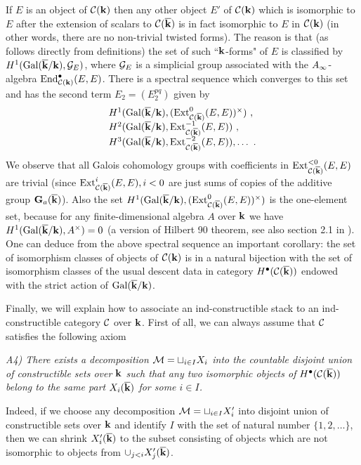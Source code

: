 \documentclass[12pt]{article}
\begin{document}
If $E$ is an object of ${\mathcal C}({\bf k})$ then any other object $E'$ of ${\mathcal C}({\bf k})$ which is isomorphic to $E$ after the extension of scalars to ${\mathcal C}({\overline{\bf k}})$
is in fact isomorphic to $E$ in ${\mathcal C}({\bf k})$ (in other words, there are no non-trivial twisted forms).
The reason is that (as follows directly from definitions) the set of such ``${\bf k}$-forms" of $E$
is classified by $H^1(\operatorname{Gal}(\overline{{\bf k}}/{\bf k}),{\cal G}_E)$, where ${\cal G}_E$ is a simplicial group
associated with the $A_{\infty}$-algebra $\operatorname{End}^\bullet_{{\mathcal C}({\bf k})}(E,E)$.
There is a spectral sequence
which converges to this set and has the second term $E_2=(E_2^{pq})$  given by
$$\begin{array}{l}
H^1(\operatorname{Gal}(\overline{{\bf k}}/{\bf k}),(\operatorname{Ext}_{{\mathcal C}({{\overline{\bf k}}})}^0(E,E))^{\times})\,\,,\\ H^2(\operatorname{Gal}(\overline{{\bf k}}/{\bf k}),\operatorname{Ext}_{{\mathcal C}({{\overline{\bf k}}})}^{-1}(E,E))\,\,,\\
H^3(\operatorname{Gal}(\overline{{\bf k}}/{\bf k}),\operatorname{Ext}_{{\mathcal C}({{\overline{\bf k}}})}^{-2}(E,E)),\dots\,\,.
\end{array}$$
We observe that all Galois cohomology groups with coefficients in $\operatorname{Ext}_{{\mathcal C}({{\overline{\bf k}}})}^{<0}(E,E)$ are trivial
(since  $\operatorname{Ext}_{{\mathcal C}({{\overline{\bf k}}})}^{i}(E,E), i<0$  are just sums of copies of the additive group ${\bf G}_a({\overline{\bf k}})$). Also the set 
$H^1(\operatorname{Gal}(\overline{{\bf k}}/{\bf k}),(\operatorname{Ext}_{{\mathcal C}({{\overline{\bf k}}})}^0(E,E))^{\times})$ is the one-element set, because for any finite-dimensional algebra
 $A$ over ${\bf k}$ we have $H^1(\operatorname{Gal}(\overline{{\bf k}}/{\bf k}),A^\times)=0$ (a version of Hilbert 90 theorem, see also section 2.1 in \cite{Jo4}). 
One can deduce from the above spectral sequence an important corollary: the set of isomorphism classes of objects of ${\mathcal C}({\bf k})$ is in a natural bijection 
 with the set of isomorphism classes of the usual descent data in  category $H^{\bullet}({{\mathcal C}({\overline{\bf k}})})$ endowed with the strict action of $\operatorname{Gal}({\overline{\bf k}}/{\bf k})$.

Finally, we will explain how to associate an ind-constructible stack to an ind-constructible category ${\mathcal C}$ over ${\bf k}$.
First of all, we can always assume that  ${\mathcal C}$ satisfies the following axiom

{\it A4) There exists a decomposition ${\cal M}=\sqcup_{i\in I}X_i$ into the countable disjoint union of constructible sets over ${\bf k}$ such that
  any  two isomorphic objects of $H^{\bullet}({\mathcal C}({\overline{\bf k}}))$  belong to the same part $X_i({\overline{\bf k}})$ for some $i\in I$.}

Indeed, if we choose any decomposition ${\cal M}=\sqcup_{i\in I}X'_i$ into disjoint union of constructible sets over ${\bf k}$ and identify
$I$ with the set of natural number $\{1,2,\dots\}$, then we can shrink $X'_i({\overline{\bf k}})$ to the subset consisting of objects which are not isomorphic to objects
 from $\cup_{j<i}X'_j({\overline{\bf k}})$.
\end{document}
